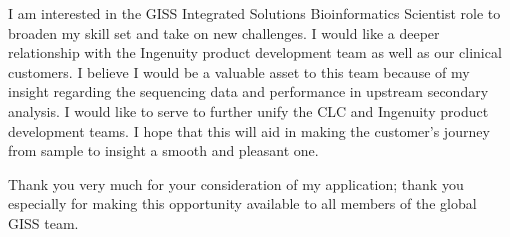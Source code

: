 \documentclass[10pt,letterpaper,sigleft]{newlfm}
\begin{document}
\begin{newlfm}
I am interested in the GISS Integrated Solutions Bioinformatics Scientist role to broaden my skill set and take on new challenges. I would like a deeper relationship with the Ingenuity product development team as well as our clinical customers. I believe I would be a valuable asset to this team because of my insight regarding the sequencing data and performance in upstream secondary analysis. I would like to serve to further unify the CLC and Ingenuity product development teams. I hope that this will aid in making the customer's journey from sample to insight a smooth and pleasant one.

Thank you very much for your consideration of my application; thank you especially for making this opportunity available to all members of the global GISS team.
 

\end{newlfm}
\end{document}
